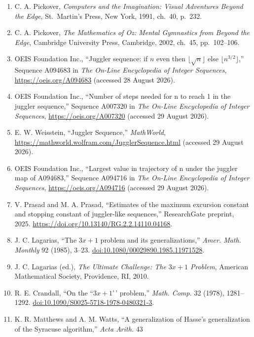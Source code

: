 \documentclass[12pt]{article}
\begin{document}
\begin{enumerate}
\def\labelenumi{\arabic{enumi}.}
\item
  C. A. Pickover, \emph{Computers and the Imagination: Visual Adventures
  Beyond the Edge}, St.~Martin's Press, New York, 1991, ch.~40, p.~232.
\item
  C. A. Pickover, \emph{The Mathematics of Oz: Mental Gymnastics from
  Beyond the Edge}, Cambridge University Press, Cambridge, 2002, ch.~45,
  pp.~102--106.
\item
  OEIS Foundation Inc., ``Juggler sequence: if \(n\) even then
  \(\lfloor\sqrt n\rfloor\) else \(\lfloor n^{3/2}\rfloor\),'' Sequence
  A094683 in \emph{The On-Line Encyclopedia of Integer Sequences},
  \url{https://oeis.org/A094683} (accessed 28 August 2026).
\item
  OEIS Foundation Inc., ``Number of steps needed for n to reach 1 in the
  juggler sequence,'' Sequence A007320 in \emph{The On-Line Encyclopedia
  of Integer Sequences}, \url{https://oeis.org/A007320} (accessed 29
  August 2026).
\item
  E. W. Weisstein, ``Juggler Sequence,'' \emph{MathWorld},
  \url{https://mathworld.wolfram.com/JugglerSequence.html} (accessed 29
  August 2026).
\item
  OEIS Foundation Inc., ``Largest value in trajectory of n under the
  juggler map of A094683,'' Sequence A094716 in \emph{The On-Line
  Encyclopedia of Integer Sequences}, \url{https://oeis.org/A094716}
  (accessed 29 August 2026).
\item
  V. Prasad and M. A. Prasad, ``Estimates of the maximum excursion
  constant and stopping constant of juggler-like sequences,''
  ResearchGate preprint, 2025.
  \url{https://doi.org/10.13140/RG.2.2.14110.04168}.
\item
  J. C. Lagarias, ``The \(3x+1\) problem and its generalizations,''
  \emph{Amer. Math. Monthly} 92 (1985), 3--23.
  \href{https://doi.org/10.1080/00029890.1985.11971528}{doi:10.1080/00029890.1985.11971528}.
\item
  J. C. Lagarias (ed.), \emph{The Ultimate Challenge: The \(3x+1\)
  Problem}, American Mathematical Society, Providence, RI, 2010.
\item
  R. E. Crandall, ``On the ``\(3x+1\)'\,' problem,'' \emph{Math. Comp.}
  32 (1978), 1281--1292.
  \href{https://doi.org/10.1090/S0025-5718-1978-0480321-3}{doi:10.1090/S0025-5718-1978-0480321-3}.
\item
  K. R. Matthews and A. M. Watts, ``A generalization of Hasse's
  generalization of the Syracuse algorithm,'' \emph{Acta Arith.} 43

\end{enumerate}
\end{document}
